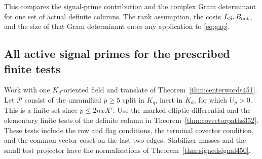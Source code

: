 \documentclass[a4paper,11pt]{article}
\theoremstyle{definition}
\theoremstyle{remark}
\numberwithin{equation}{section}
\begin{document}
This compares the signal-prime contribution and the complex
Gram determinant for one set of actual definite columns. The
rank assumption, the costs \(L_{\mathcal S},B_{\rm out}\),
and the size of that Gram determinant enter any application to
\eqref{eq:gap}.


\subsection{All active signal primes for the prescribed finite tests}
\label{sec:signaltestsupport452}

Work with one \(K_d\)-oriented field and translate of
Theorem~\ref{thm:centerwords451}. Let \(\mathcal P\) consist of the
unramified \(p\ge5\) split in \(K_q\), inert in \(K_d\), for which
\(U_p>0\). This is a finite set since \(p\le 2nxX'\).
Use the marked elliptic differential and the elementary finite
tests of the definite column in Theorem~\ref{thm:covectorpaths352}.
These tests include the row and flag conditions, the terminal
covector condition, and the common vector coset on the last two
edges. Stabilizer masses and the small test projector have the
normalizations of Theorem~\ref{thm:signedsignal450}.
\end{document}
